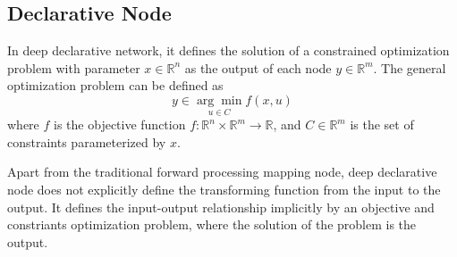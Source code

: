 \subsection{Declarative Node}
In deep declarative network, it defines the solution of a constrained optimization problem with parameter $x \in \mathbb{R}^n$ as the output of each node $y \in \mathbb{R}^m$. The general optimization problem can be defined as 
\begin{equation}
    y \in \underset{u \in C}{\arg \min } f(x, u)
\end{equation}
where $f$ is the objective function $f: \mathbb{R}^n \times \mathbb{R}^m \rightarrow \mathbb{R}$, and $C \in \mathbb{R}^m$ is the set of constraints parameterized by $x$. 
\par Apart from the traditional forward processing mapping node, deep declarative node does not explicitly define the transforming function from the input to the output. It defines the input-output relationship implicitly by an objective and constriants optimization problem, where the solution of the problem is the output. 
